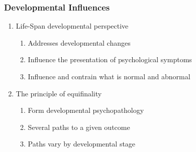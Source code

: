 \documentclass[12pt]{article}
\begin{document}
\subsubsection{Developmental Influences}
\begin{enumerate}
\item Life-Span developmental perspective
  \begin{enumerate}
  \item Addresses developmental changes
  \item Influence the presentation of psychological symptoms
  \item Influence and contrain what is normal and abnormal
  \end{enumerate}
\item The principle of equifinality
  \begin{enumerate}
  \item Form developmental psychopathology
  \item Several paths to a given outcome
  \item Paths vary by developmental stage
  \end{enumerate}
\end{enumerate}
\end{document}

